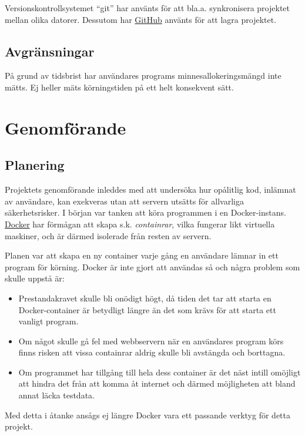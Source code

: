 \documentclass{article}
\begin{document}
Versionskontrollsystemet ``git'' har använts för att bla.a. synkronisera
projektet mellan olika datorer. Dessutom har \href{https://github.com/}{GitHub}
använts för att lagra projektet.

\subsection{Avgränsningar}

På grund av tidsbrist har användares programs minnesallokeringsmängd inte mätts.
Ej heller mäts körningstiden på ett helt konsekvent sätt.


\section{Genomförande}

\subsection{Planering}

Projektets genomförande inleddes med att undersöka hur opålitlig kod, inlämnat
av användare, kan exekveras utan att servern utsätts för allvarliga
säkerhetsrisker. I början var tanken att köra programmen i en Docker-instans.
\href{https://www.docker.com}{Docker} har förmågan att skapa s.k.
\textit{containrar}, vilka fungerar likt virtuella maskiner, och är därmed
isolerade från resten av servern.

Planen var att skapa en ny container varje gång en användare lämnar in ett
program för körning. Docker är inte gjort att användas så och några problem som
skulle uppstå är:
\begin{itemize}
	\item Prestandakravet skulle bli onödigt högt, då tiden det tar att starta
		en Docker-container är betydligt längre än det som krävs för att starta
		ett vanligt program.
	\item Om något skulle gå fel med webbservern när en användares program körs
		finns risken att vissa containrar aldrig skulle bli avstängda och
		borttagna.
	\item Om programmet har tillgång till hela dess container är det näst
		intill omöjligt att hindra det från att komma åt internet och därmed
		möjligheten att bland annat läcka testdata.
\end{itemize}
Med detta i åtanke ansågs ej längre Docker vara ett passande verktyg för detta
projekt.
\end{document}
